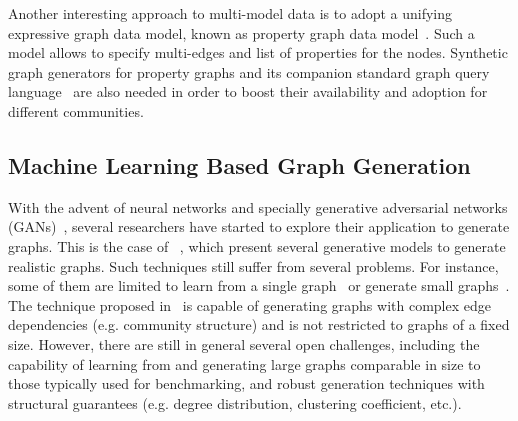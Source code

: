 Another interesting approach to multi-model data is to adopt a unifying
expressive graph data model, known as property graph data
model~\cite{BFVY18}. Such a model allows to specify multi-edges and list of
properties for the nodes. Synthetic graph generators for property graphs and its
companion standard graph query language~\cite{Angles18,AnglesABBFGLPPS18} are also needed in order to boost
their availability and adoption for different communities.


\subsection{Machine Learning Based Graph Generation}

With the advent of neural networks and specially generative adversarial networks
(GANs)~\cite{goodfellow2014generative}, several researchers have started to
explore their application to generate graphs. This is the case of
~\cite{kipf2016variational,grover2018graphite,simonovsky2018graphvae,li2018learning,you2018graphrnn},
which present several generative models to generate realistic graphs.  Such
techniques still suffer from several problems. For instance, some of them are
limited to learn from a single
graph~\cite{kipf2016variational,grover2018graphite} or generate small
graphs~\cite{simonovsky2018graphvae,li2018learning,you2018graphrnn}. The
technique proposed in~\cite{you2018graphrnn} is capable of generating graphs
with complex edge dependencies (e.g. community structure) and is not restricted
to graphs of a fixed size. However, there are still in general several open
challenges, including the capability of learning from and generating large graphs comparable
in size to those typically used for benchmarking, and robust generation
techniques with structural guarantees (e.g. degree distribution, clustering
coefficient, etc.).


